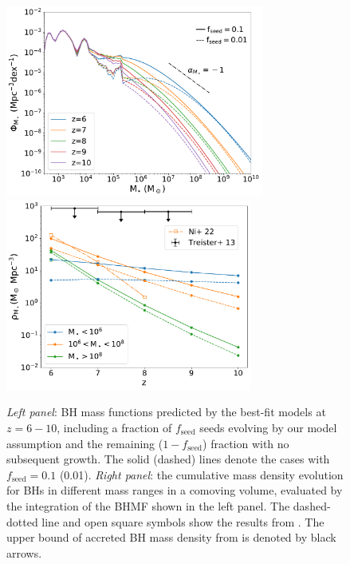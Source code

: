 \documentclass[twocolumn, twocolappendix]{aastex63}
\newcommand{\fseed}{f_\mathrm{seed}}
\begin{document}
\begin{CJK*}{UTF8}{gbsn}
\begin{figure}
\centering
\includegraphics[width=85mm]{MF.pdf}\hspace{5mm}
\includegraphics[width=81mm]{rhoM_comb.pdf}
\caption{
{\it Left panel}: BH mass functions predicted by the best-fit models at $z=6-10$,
including a fraction of $\fseed$ seeds evolving by our model assumption and the remaining ($1-\fseed$) fraction with no subsequent growth.
The solid (dashed) lines denote the cases with $\fseed=0.1$ (0.01).
{\it Right panel}: the cumulative mass density evolution for BHs in different mass ranges in a comoving volume, 
evaluated by the integration of the BHMF shown in the left panel.
The dashed-dotted line and open square symbols show the results from \citet{2022MNRAS.513..670N}.
The upper bound of accreted BH mass density from \citet{2013ApJ...778..130T} is denoted by black arrows.
}
\label{fig:BHMF_rhoz}
\vspace{5mm}
\end{figure}



\end{CJK*}
\end{document}
